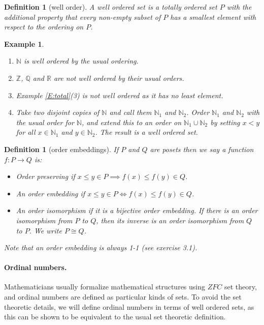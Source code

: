 \documentclass{article}
\theoremstyle{plain}
\newtheorem{definition}[theorem]{Definition}{\bfseries}{\upshape}
\newtheorem{example}[theorem]{Example}{\bfseries}{\upshape}
\newcommand{\bN}{\mathbb{N}}
\newcommand{\bZ}{\mathbb{Z}}
\newcommand{\bQ}{\mathbb{Q}}
\newcommand{\bR}{\mathbb{R}}
\begin{document}
\begin{definition}[well order]
A \emph{well ordered set} is a totally ordered set $P$ with the additional property that every non-empty subset of $P$ has a smallest element with respect to the ordering on $P$.
\end{definition}

\begin{example}\mbox{}
\begin{enumerate}
\item $\bN$ is well ordered by the usual ordering.
\item $\bZ$, $\bQ$ and $\bR$ are \emph{not} well ordered by their usual orders.
\item Example \ref{E:total}(3) is not well ordered as it has no least element.
\item Take two disjoint copies of $\bN$ and call them $\bN_1$ and $\bN_2$. Order $\bN_1$ and $\bN_2$ with the usual order for $\bN$, and extend this to an order on $\bN_1\cup\bN_2$ by setting $x< y$ for all $x\in\bN_1$ and $y\in \bN_2$. The result is a well ordered set.
\end{enumerate}
\end{example}



\begin{definition}[order embeddings]
If $P$ and $Q$ are posets then we say a function $f:P\to Q$ is:
\begin{itemize}
\item \emph{Order preserving} if $x\leq y \in P\implies f(x)\leq f(y)\in Q$.
\item An \emph{order embedding} if $x\leq y \in P\iff f(x)\leq f(y)\in Q$.
\item An \emph{order isomorphism} if it is a bijective order embedding. If there is an order isomorphism from $P$ to $Q$, then its inverse is an order isomorphism from $Q$ to $P$. We write $P\cong Q$.
\end{itemize}
Note that an order embedding is always 1-1 (see exercise 3.1). 
\end{definition}


\paragraph{Ordinal numbers.}
Mathematicians usually formalize mathematical structures using $ZFC$ set theory, and ordinal numbers are defined as particular kinds of sets. To avoid the set theoretic details, we will define ordinal numbers in terms of well ordered sets, as this can be shown to be equivalent to the usual set theoretic definition.
\end{document}
